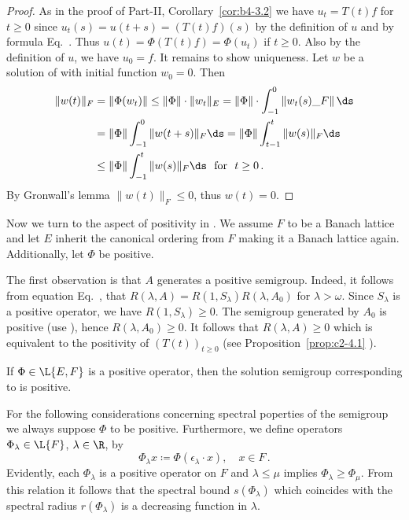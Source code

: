 \begin{proof}
As in the proof of Part-II, Corollary~\ref{cor:b4-3.2} we have $u_t = T(t)f$ for $t \geq 0$ since $u_t(s) = u(t+s) = (T(t)f)(s)$ by the definition of\/ $u$ and by formula Eq.~.
Thus $u(t) = \Phi(T(t)f) = \Phi(u_t)$ if\/ $t \geq 0$.
Also by the definition of\/ $u$, we have $u_{0} = f$.
It remains to show uniqueness.
Let $w$ be a solution of  with initial function $w_{0} = 0$.
Then
\begin{align*}
\|w(t)\|_F & = \|\Phi(w_{t})\| \leq \|\Phi\| \cdot  \|w_{t}\|_{E} =  \|\Phi\| \cdot \int_{-1}^{0} \|w_{t}(s)\_{F}\| \, \ds \\
&=  \|\Phi\| \int_{-1}^0 \|w(t+s)\|_{F} \ds = \|\Phi\| \int_{t-1}^{t} \|w(s)\|_{F} \ds \\
&\leq \|\Phi\| \int_{-1}^{t} \|w(s)\|_{F} \ds \ \text{ for } \ t \geq 0\,.
\end{align*}
By Gronwall's lemma $\|w(t)\|_F \leq 0$, thus $w(t) = 0$.
\end{proof}
Now we turn to the aspect of positivity in . We assume $F$ to be a Banach lattice and let $E$ inherit the canonical ordering from $F$ making it a Banach lattice again. Additionally, let $\Phi$ be positive.

The first observation is that $A$ generates a positive semigroup.
Indeed, it follows from equation Eq.~, that $R(\lambda,A) = R(1,S_\lambda)R(\lambda,A_{0})$ for $\lambda > \omega$. Since $S_\lambda$ is a positive operator, we have $R(1,S_\lambda) \geq 0$.
The semigroup generated by $A_{0}$ is positive (use ), hence $R(\lambda,A_{0}) \geq 0$.
It follows that $R(\lambda,A) \geq 0$ which is equivalent to the positivity of\/ $(T(t))_{t \geq 0}$ (see Proposition~\ref{prop:c2-4.1} ).
\begin{proposition}\label{prop:c4-3.3}
If\/ $\Phi \in \L{E,F}$ is a positive operator, then the solution semigroup corresponding to  is positive.
\end{proposition}
For the following considerations concerning spectral poperties of the semigroup we always suppose $\Phi$ to be positive. Furthermore, we define operators $\Phi_{\lambda} \in \L{F}$, $\lambda \in \R$, by
\begin{equation}\label{eq:c4-3.6}
\Phi_\lambda x \coloneqq \Phi(\epsilon_{\lambda} \cdot x), \quad x \in F\,.
\end{equation}
Evidently, each $\Phi_\lambda$ is a positive operator on $F$ and $\lambda \leq \mu$ implies $\Phi_{\lambda} \geq \Phi_{\mu}$.
From this relation it follows that the spectral bound $s(\Phi_{\lambda})$ which coincides with the spectral radius $r(\Phi_{\lambda})$ is a decreasing function in $\lambda$.

